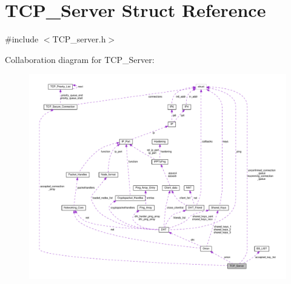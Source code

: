 \hypertarget{struct_t_c_p___server}{\section{T\+C\+P\+\_\+\+Server Struct Reference}
\label{struct_t_c_p___server}
}


{\ttfamily \#include $<$T\+C\+P\+\_\+server.\+h$>$}



Collaboration diagram for T\+C\+P\+\_\+\+Server\+:
\nopagebreak
\begin{figure}[H]
\begin{center}
\leavevmode
\includegraphics[width=350pt]{dd/de7/struct_t_c_p___server__coll__graph}
\end{center}
\end{figure}
